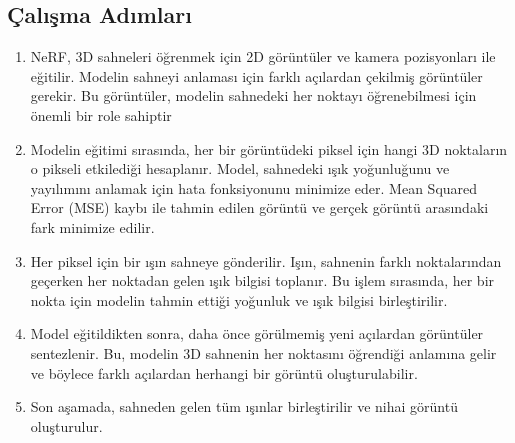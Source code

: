 \subsection{Çalışma Adımları}

\begin{enumerate}
    \item NeRF, 3D sahneleri öğrenmek için 2D görüntüler ve kamera pozisyonları ile eğitilir. Modelin sahneyi anlaması için farklı açılardan çekilmiş görüntüler gerekir. Bu görüntüler, modelin sahnedeki her noktayı öğrenebilmesi için önemli bir role sahiptir
    \item Modelin eğitimi sırasında, her bir görüntüdeki piksel için hangi 3D noktaların o pikseli etkilediği hesaplanır. Model, sahnedeki ışık yoğunluğunu ve yayılımını anlamak için hata fonksiyonunu minimize eder. Mean Squared Error (MSE) kaybı ile tahmin edilen görüntü ve gerçek görüntü arasındaki fark minimize edilir.
    \item Her piksel için bir ışın sahneye gönderilir. Işın, sahnenin farklı noktalarından geçerken her noktadan gelen ışık bilgisi toplanır. Bu işlem sırasında, her bir nokta için modelin tahmin ettiği yoğunluk ve ışık bilgisi birleştirilir.
    \item Model eğitildikten sonra, daha önce görülmemiş yeni açılardan görüntüler sentezlenir. Bu, modelin 3D sahnenin her noktasını öğrendiği anlamına gelir ve böylece farklı açılardan herhangi bir görüntü oluşturulabilir.
    \item Son aşamada, sahneden gelen tüm ışınlar birleştirilir ve nihai görüntü oluşturulur. 
\end{enumerate}

\newpage